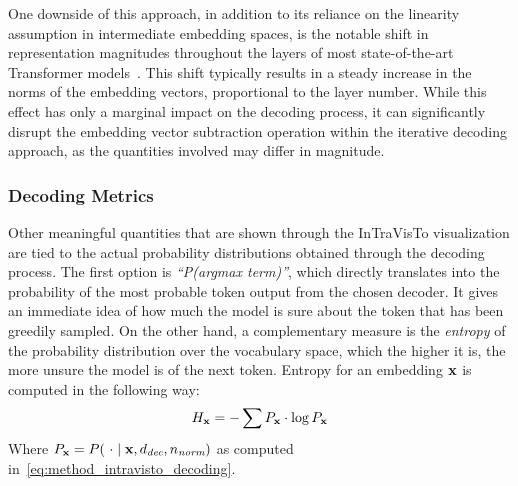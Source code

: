 One downside of this approach, in addition to its reliance on the linearity assumption in intermediate embedding spaces, is the notable shift in representation magnitudes throughout the layers of most state-of-the-art Transformer models~\cite{heimersheim2023}.
This shift typically results in a steady increase in the norms of the embedding vectors, proportional to the layer number.
While this effect has only a marginal impact on the decoding process, it can significantly disrupt the embedding vector subtraction operation within the iterative decoding approach, as the quantities involved may differ in magnitude.

\subsubsection{Decoding Metrics}\label{sssec:method_intravisto_decoding_metrics}

Other meaningful quantities that are shown through the InTraVisTo visualization are tied to the actual probability distributions obtained through the decoding process.
The first option is \emph{``P(argmax term)''}, which directly translates into the probability of the most probable token output from the chosen decoder. %
It gives an immediate idea of how much the model is sure about the token that has been greedily sampled.
On the other hand, a complementary measure is the \emph{entropy} of the probability distribution over the vocabulary space, which the higher it is, the more unsure the model is of the next token.
Entropy for an embedding $\bm{\mathbf{x}}$ is computed in the following way:
\begin{equation}
    \label{eq:method_intravisto_entropy}
    H_{\bm{\mathbf{x}}} = -\sum{P_{\bm{\mathbf{x}}} \cdot \log{P_{\bm{\mathbf{x}}}}}
\end{equation}
Where $P_{\bm{\mathbf{x}}} = P(\ \cdot \mid \bm{\mathbf{x}}, d_\textit{dec}, n_\textit{norm})$ as computed in~\cref{eq:method_intravisto_decoding}.

